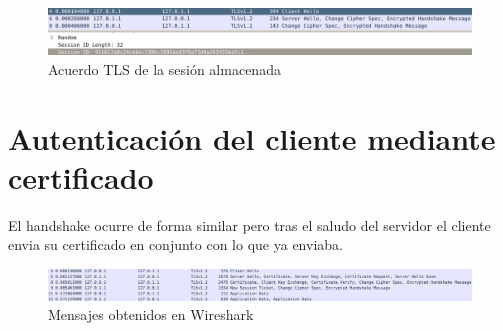 \documentclass[11pt]{article}
\begin{document}
    \begin{figure}[H]
      \centering
      \includegraphics[width = \textwidth]{tls3}
      \caption{Acuerdo TLS de la sesión almacenada}
    \end{figure}


  \section{Autenticación del cliente mediante certificado}
    \par
    El handshake ocurre de forma similar pero tras el saludo del servidor el
    cliente envia su certificado en conjunto con lo que ya enviaba.

    \begin{figure}[H]
      \centering
      \includegraphics[width = \textwidth]{tls_client}
      \caption{Mensajes obtenidos en Wireshark}
    \end{figure}
\end{document}
